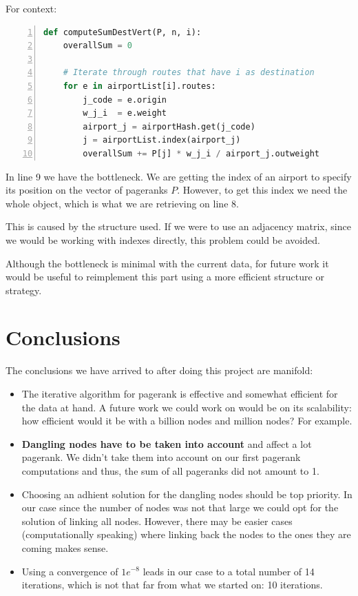 \documentclass[10pt, a4paper]{article}
\begin{document}
For context:

\begin{lstlisting}[language=Python,  breaklines=true, numbers=left,   frame=single]
def computeSumDestVert(P, n, i):
    overallSum = 0

    # Iterate through routes that have i as destination
    for e in airportList[i].routes:
        j_code = e.origin
        w_j_i  = e.weight
        airport_j = airportHash.get(j_code)
        j = airportList.index(airport_j)
        overallSum += P[j] * w_j_i / airport_j.outweight
\end{lstlisting}

In line 9 we have the bottleneck. We are getting the index of an airport to specify its position on the vector of pageranks $P$. However, to get this index we need the whole object, which is what we are retrieving on line 8.

This is caused by the structure used. If we were to use an adjacency matrix, since we would be working with indexes directly, this problem could be avoided.

Although the bottleneck is minimal with the current data, for future work it would be useful to reimplement this part using a more efficient structure or strategy.

\section{Conclusions}
The conclusions we have arrived to after doing this project are manifold:
\begin{itemize}
    \item The iterative algorithm for pagerank is effective and somewhat efficient for the data at hand. A future work we could work on would be on its scalability: how efficient would it be with a billion nodes and million nodes? For example.
    \item \textbf{Dangling nodes have to be taken into account} and affect a lot pagerank. We didn't take them into account on our first pagerank computations and thus, the sum of all pageranks did not amount to 1. 
    \item Choosing an adhient solution for the dangling nodes should be top priority. In our case since the number of nodes was not that large we could opt for the solution of linking all nodes. However, there may be easier cases (computationally speaking) where linking back the nodes to the ones they are coming makes sense.
    \item Using a convergence of $1e^{-8}$ leads in our case to a total number of 14 iterations, which is not that far from what we started on: 10 iterations.
\end{itemize}

\newpage
\nocite{*}


\end{document}
